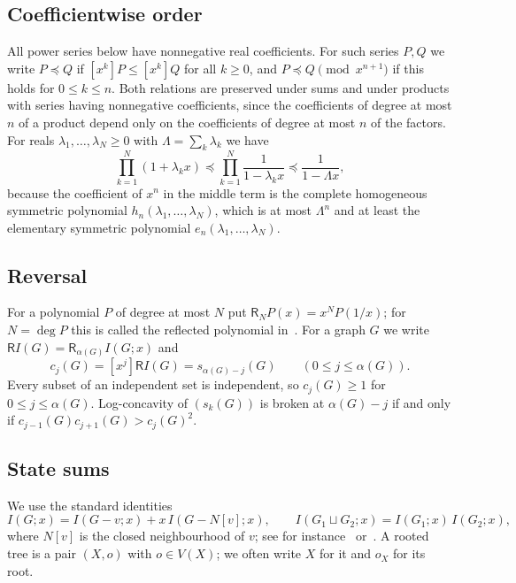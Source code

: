 \documentclass[11pt]{amsart}
\theoremstyle{definition}
\theoremstyle{remark}
\numberwithin{equation}{section}
\newcommand{\R}{\mathsf{R}}
\newcommand{\coef}[2]{[x^{#1}]#2}
\begin{document}
\subsection{Coefficientwise order}
All power series below have nonnegative real coefficients. For such series $P,Q$ we write $P\preceq Q$ if $\coef{k}{P}\le\coef{k}{Q}$ for all $k\ge0$, and $P\preceq Q\pmod{x^{n+1}}$ if this holds for $0\le k\le n$. Both relations are preserved under sums and under products with series having nonnegative coefficients, since the coefficients of degree at most $n$ of a product depend only on the coefficients of degree at most $n$ of the factors. For reals $\lambda_1,\dots,\lambda_N\ge0$ with $\Lambda=\sum_k\lambda_k$ we have
\begin{equation}\label{eq:envelope-basic}
\prod_{k=1}^N(1+\lambda_kx)\preceq\prod_{k=1}^N\frac1{1-\lambda_kx}\preceq\frac1{1-\Lambda x},
\end{equation}
because the coefficient of $x^n$ in the middle term is the complete homogeneous symmetric polynomial $h_n(\lambda_1,\dots,\lambda_N)$, which is at most $\Lambda^n$ and at least the elementary symmetric polynomial $e_n(\lambda_1,\dots,\lambda_N)$.

\subsection{Reversal}
For a polynomial $P$ of degree at most $N$ put $\R_NP(x)=x^NP(1/x)$; for $N=\deg P$ this is called the reflected polynomial in~\cite{BR1,BR2,BGG,Yu}. For a graph $G$ we write $\R I(G)=\R_{\alpha(G)}I(G;x)$ and
\[
c_j(G)=\coef{j}{\R I(G)}=s_{\alpha(G)-j}(G)\qquad(0\le j\le\alpha(G)).
\]
Every subset of an independent set is independent, so $c_j(G)\ge1$ for $0\le j\le\alpha(G)$. Log-concavity of $(s_k(G))$ is broken at $\alpha(G)-j$ if and only if $c_{j-1}(G)c_{j+1}(G)>c_j(G)^2$.

\subsection{State sums}
We use the standard identities
\begin{equation}\label{eq:deletion}
I(G;x)=I(G-v;x)+x\,I(G-N[v];x),\qquad I(G_1\sqcup G_2;x)=I(G_1;x)\,I(G_2;x),
\end{equation}
where $N[v]$ is the closed neighbourhood of $v$; see for instance~\cite[Lemma~2.1]{Bencs} or~\cite[Lemma~2.1]{WZ}. A rooted tree is a pair $(X,o)$ with $o\in V(X)$; we often write $X$ for it and $o_X$ for its root.
\end{document}
